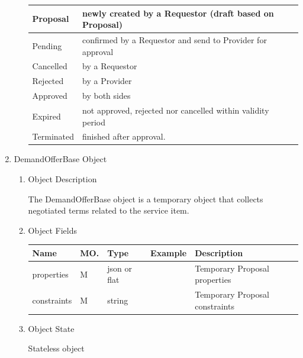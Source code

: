 \begin{enumerate}
\begin{enumerate}
\begin{center}
\begin{tabular}{|p{3cm}|p{11cm}|}
Proposal	&	newly created by a Requestor (draft based on Proposal) \\
\hline
Pending		&	confirmed by a Requestor and send to Provider for approval \\
\hline
Cancelled 	& 	by a Requestor \\
\hline
Rejected 	&	by a Provider \\
\hline
Approved 	&	by both sides \\
\hline
Expired 	&	not approved, rejected nor cancelled within validity period \\
\hline
Terminated 	&	finished after approval. \\
\hline

\end{tabular}
\end{center}

\end{enumerate}

\item DemandOfferBase Object

\begin{enumerate}

\item Object Description

The DemandOfferBase object is a temporary object that collects negotiated terms related to the service item.

\item Object Fields

\begin{center}
\begin{tabular}{|p{3cm}|l|p{3cm}|p{3cm}|p{4cm}|} 
\hline
\rowcolor{lightgray}	Name	& MO.	& Type	& Example & 	Description \\
\hline

properties	& M	& 	json or flat	&		&  Temporary Proposal properties \\ 

\hline

constraints	& M	& 	string	&		&	Temporary Proposal constraints \\ 

\hline

\end{tabular}
\end{center}

\item Object State

Stateless object

\end{enumerate}

\end{enumerate}

